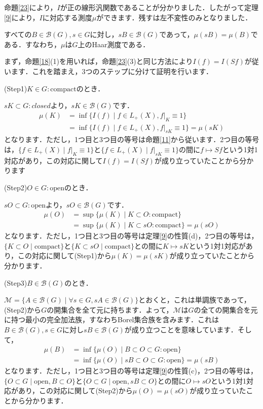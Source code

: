 命題\ref{23}により，$I$が正の線形汎関数であることが分かりました．したがって定理\ref{9}により，$I$に対応する測度$\mu$ができます．残すは左不変性のみとなりました．

\begin{yprop}\label{25}
すべての$B \in \mathscr{B}(G), s \in G$に対し，$sB \in \mathscr{B}(G)$であって，$\mu(sB)=\mu(B)$である．すなわち，$\mu$は$G$上のHaar測度である．
\end{yprop}
\begin{Proof}
まず，命題\ref{18}(1)を用いれば，命題\ref{23}(3)と同じ方法により$I(f)=I(Sf)$が従います．これを踏まえ，3つのステップに分けて証明を行います．

(Step1)$K \in G : \mathrm{compact}$のとき．

$sK \subset G : closed$より，$sK \in  \mathscr{B}(G)$です．
\begin{align*}
\mu(K) & = \inf \{ I(f) \mid f \in L_{+}(X), f|_{K} \equiv 1 \} \\
 & =\inf \{ I(f) \mid f \in L_{+}(X), f|_{sK} \equiv 1 \}=\mu(sK)
\end{align*}
となります．ただし，1つ目と3つ目の等号は命題\ref{11}から従います．2つ目の等号は，$\{ f \in L_{+}(X) \mid f|_{K} \equiv 1 \}$と$\{ f \in L_{+}(X) \mid f|_{sK} \equiv 1 \}$の間に$f \mapsto Sf$という1対1対応があり，この対応に関して$I(f)=I(Sf)$が成り立っていたことから分かります

(Step2)$O \in G : \mathrm{open}$のとき．

$sO \subset G : \mathrm{open}$より，$sO \in \mathscr{B}(G)$です．
\begin{align*}
\mu(O) & = \sup \{ \mu(K) \mid K \subset O : \mathrm{compact} \} \\
 & =\sup \{ \mu(K) \mid K \subset sO : \mathrm{compact} \} = \mu (sO)
\end{align*}
となります．ただし，1つ目と3つ目の等号は定理\ref{9}の性質(d)，2つ目の等号は，$\{ K \subset O \mid \mathrm{compact} \}$と$\{ K \subset sO \mid \mathrm{compact} \}$との間に$K \mapsto sK$という1対1対応があり，この対応に関して(Step1)から$\mu(K)=\mu(sK)$が成り立っていたことから分かります．

(Step3)$B \in \mathscr{B}(G)$のとき．

$\mathscr{M}=\{A \in \mathscr{B}(G) \mid \forall s \in G , sA \in \mathscr{B}(G) \}$とおくと，これは単調族であって，(Step2)から$G$の開集合を全て元に持ちます．よって，$\mathscr{M}$は$G$の全ての開集合を元に持つ最小の完全加法族，すなわちBorel集合族を含みます．これは$B \in \mathscr{B}(G), s \in G$に対し$ sB \in \mathscr{B}(G)$が成り立つことを意味しています．そして，
\begin{align*}
\mu(B) & = \inf \{ \mu(O) \mid B \subset O \subset G : \mathrm{open}\} \\
 & = \inf \{ \mu(O) \mid sB \subset O \subset G : \mathrm{open}\} = \mu(sB)
\end{align*}
となります．ただし，1つ目と3つ目の等号は定理\ref{9}の性質(c)，2つ目の等号は，$\{ O \subset G \mid \mathrm{open}, B \subset O \}$と$\{ O \subset G \mid \mathrm{open}, sB \subset O \}$との間に$O \mapsto sO$という1対1対応があり，この対応に関して(Step2)から$\mu(O)=\mu(sO)$が成り立っていたことから分かります．


\end{Proof}
